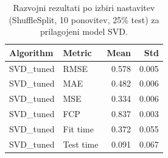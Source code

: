\begin{table}[h]
\centering
\caption{Razvojni rezultati po izbiri nastavitev (ShuffleSplit, 10 ponovitev, 25\% test) za prilagojeni model SVD.}
\label{tab:cv_results_tuned_svd}
\begin{tabular}{llrr}
\toprule
Algorithm & Metric & Mean & Std \\
\midrule
SVD\_tuned & RMSE & 0.578 & 0.005 \\
SVD\_tuned & MAE & 0.482 & 0.006 \\
SVD\_tuned & MSE & 0.334 & 0.006 \\
SVD\_tuned & FCP & 0.837 & 0.003 \\
SVD\_tuned & Fit time & 0.372 & 0.055 \\
SVD\_tuned & Test time & 0.091 & 0.067 \\
\bottomrule
\end{tabular}

\end{table}
